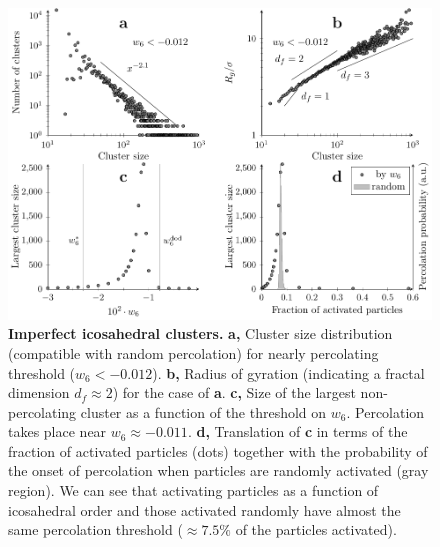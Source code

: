 \begin{figure}
\begin{center}

\includegraphics{generate_figures-figure7.pdf}
\end{center}
	\caption{\textbf{Imperfect icosahedral clusters.} \textbf{a,} Cluster size distribution (compatible with random percolation) for nearly percolating threshold ($w_6<-0.012$). 
\textbf{b,} Radius of gyration (indicating a fractal dimension $d_f\approx 2$) for the case of {\bf a}. \textbf{c,} Size of the largest non-percolating cluster as a function of the threshold on $w_6$. Percolation takes place near $w_6\approx -0.011$. \textbf{d,} Translation of \textbf{c} in terms of the fraction of activated particles (dots) together with the probability of the onset of percolation when particles are randomly activated (gray region). We can see that activating particles as a function of icosahedral order and 
those activated randomly have almost the same percolation threshold ($\approx7.5\%$ of the particles activated).}
	\label{fig:percolation}
\end{figure}
\clearpage

